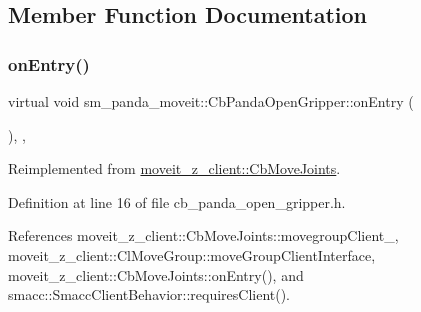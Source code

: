 \subsection{Member Function Documentation}
\mbox{\label{classsm__panda__moveit_1_1CbPandaOpenGripper_ace4c87d312e8343fcf392f43956f954f}} 
\subsubsection{\texorpdfstring{on\+Entry()}{onEntry()}}
{\footnotesize\ttfamily virtual void sm\+\_\+panda\+\_\+moveit\+::\+Cb\+Panda\+Open\+Gripper\+::on\+Entry (\begin{DoxyParamCaption}{ }\end{DoxyParamCaption})\hspace{0.3cm}{\ttfamily [inline]}, {\ttfamily [override]}, {\ttfamily [virtual]}}



Reimplemented from \hyperlink{classmoveit__z__client_1_1CbMoveJoints_a512e97e94ab05ee12837433e5d921095}{moveit\+\_\+z\+\_\+client\+::\+Cb\+Move\+Joints}.



Definition at line 16 of file cb\+\_\+panda\+\_\+open\+\_\+gripper.\+h.



References moveit\+\_\+z\+\_\+client\+::\+Cb\+Move\+Joints\+::movegroup\+Client\+\_\+, moveit\+\_\+z\+\_\+client\+::\+Cl\+Move\+Group\+::move\+Group\+Client\+Interface, moveit\+\_\+z\+\_\+client\+::\+Cb\+Move\+Joints\+::on\+Entry(), and smacc\+::\+Smacc\+Client\+Behavior\+::requires\+Client().


